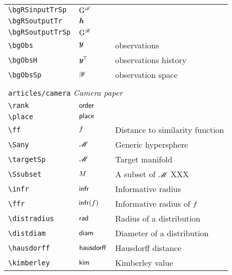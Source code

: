 \begin{longtable}{lll}
 {\color[rgb]{0.5,0.5,0.5}\texttt{\textbackslash bgRSinputTrSp}} & $\mathrm{G}^{\mathscr{A}}$ &  \\ 
 {\color[rgb]{0.5,0.5,0.5}\texttt{\textbackslash bgRSoutputTr}} & $\boldsymbol{h}$ &  \\ 
 {\color[rgb]{0.5,0.5,0.5}\texttt{\textbackslash bgRSoutputTrSp}} & $\mathrm{G}^{\mathscr{B}}$ & \\ 
 {\color[rgb]{0.5,0.5,0.5}\texttt{\textbackslash bgObs}} & $\boldsymbol{y}$ &  observations\\ 
 {\color[rgb]{0.5,0.5,0.5}\texttt{\textbackslash bgObsH}} & $\boldsymbol{y}^{\mathbb{T}}$ &  observations history\\ 
 {\color[rgb]{0.5,0.5,0.5}\texttt{\textbackslash bgObsSp}} & $\mathscr{Y}$ &  observation space\\ 
  &  & \\ 
 \multicolumn{3}{l}{{\color[rgb]{0.5,0.5,0.5}\texttt{articles/camera}} \emph{Camera paper}}\\ 
 \hline
{\color[rgb]{0.5,0.5,0.5}\texttt{\textbackslash rank}} & $\mathsf{order}$ & \\ 
 {\color[rgb]{0.5,0.5,0.5}\texttt{\textbackslash place}} & $\mathsf{place}$ & \\ 
 {\color[rgb]{0.5,0.5,0.5}\texttt{\textbackslash ff}} & $f$ &  Distance to similarity function\\ 
 {\color[rgb]{0.5,0.5,0.5}\texttt{\textbackslash Sany}} & $\mathscr{M}$ &  Generic hypersphere\\ 
 {\color[rgb]{0.5,0.5,0.5}\texttt{\textbackslash targetSp}} & $\mathscr{M}$ &  Target manifold\\ 
 {\color[rgb]{0.5,0.5,0.5}\texttt{\textbackslash Ssubset}} & $M$ &  A subset of $\mathscr{M}$  XXX\\ 
 {\color[rgb]{0.5,0.5,0.5}\texttt{\textbackslash infr}} & $\mathsf{infr}$ &  Informative radius\\ 
 {\color[rgb]{0.5,0.5,0.5}\texttt{\textbackslash ffr}} & $\mathsf{infr}(f)$ &  Informative radius of $f$\\ 
 {\color[rgb]{0.5,0.5,0.5}\texttt{\textbackslash distradius}} & $\mathsf{rad}$ &  Radius of a distribution\\ 
 {\color[rgb]{0.5,0.5,0.5}\texttt{\textbackslash distdiam}} & $\mathsf{diam}$ &  Diameter of a distribution\\ 
 {\color[rgb]{0.5,0.5,0.5}\texttt{\textbackslash hausdorff}} & $\mathsf{hausdorff}$ &  Hausdorff distance\\ 
 {\color[rgb]{0.5,0.5,0.5}\texttt{\textbackslash kimberley}} & $\mathsf{kim}$ &  Kimberley value\\ 

\end{longtable}
